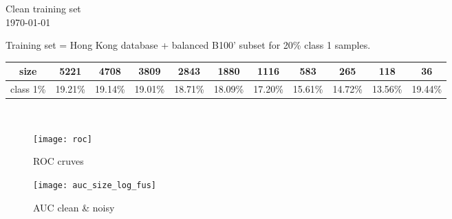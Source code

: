 \documentclass[10pt]{article}
\newcommand{\1}{\mathbbm{1}}
\newcommand{\0}{\mathbf{0}}
\begin{document}
\begin{center}
\sc\Large Clean training set \\ {\small\today}
\end{center}
\vspace{10pt}

Training set = Hong Kong database + balanced B100' subset for 20\% class 1 samples. 
\begin{table}[H]
\centering
\begin{tabular}{|c|c|c|c|c|c|c|c|c|c|c|}
\hline
size & 5221 &4708 &3809 &2843 &1880 &1116 &583 &265 &118 &36 \\
\hline
class 1\% & 19.21\% &19.14\% &19.01\% &18.71\% &18.09\% &17.20\% &15.61\% &14.72\% &13.56\% &19.44\%\\
\hline
\end{tabular}
\end{table}
\begin{figure}[H]
    \centering
    \\
\end{figure}

\begin{figure}[H]
    \centering
    \texttt{[image: roc]}
    \caption{ROC cruves}
\end{figure}

\begin{figure}[H]
    \centering
    \texttt{[image: auc\_size\_log\_fus]}
    \caption{AUC clean \& noisy}
\end{figure}
\end{document}
